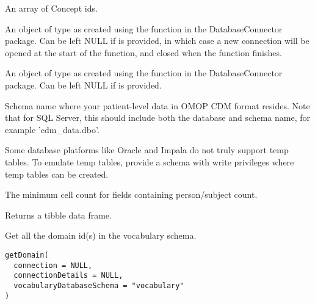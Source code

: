 \documentclass[a4paper]{book}
\begin{document}
\begin{Arguments}
\begin{ldescription}
\item[\code{conceptIds}] An array of Concept ids.

\item[\code{connection}] An object of type  as created using the
 function in the
DatabaseConnector package. Can be left NULL if 
is provided, in which case a new connection will be opened at the start
of the function, and closed when the function finishes.

\item[\code{connectionDetails}] An object of type  as created using the
 function in the
DatabaseConnector package. Can be left NULL if  is
provided.

\item[\code{cdmDatabaseSchema}] Schema name where your patient-level data in OMOP CDM format resides.
Note that for SQL Server, this should include both the database and
schema name, for example 'cdm\_data.dbo'.

\item[\code{tempEmulationSchema}] Some database platforms like Oracle and Impala do not truly support temp tables. To emulate temp 
tables, provide a schema with write privileges where temp tables can be created.

\item[\code{minCellCount}] The minimum cell count for fields containing person/subject count.
\end{ldescription}
\end{Arguments}
%
\begin{Value}
Returns a tibble data frame.
\end{Value}
%
\begin{Description}\relax
Get all the domain id(s) in the vocabulary schema.
\end{Description}
%
\begin{Usage}
\begin{verbatim}
getDomain(
  connection = NULL,
  connectionDetails = NULL,
  vocabularyDatabaseSchema = "vocabulary"
)
\end{verbatim}
\end{Usage}
%
\end{document}
